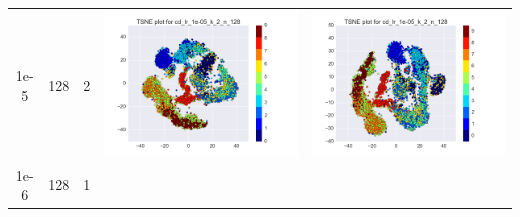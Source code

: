 \documentclass[12pt]{report}
\begin{document}
\begin{table}[H]
\begin{tabular}{ | c | c | c | c || c |}
\begin{minipage}{.3\textwidth}
    \end{minipage}
    \\ \hline
    1e-5 & 128 & 2 &
    \begin{minipage}{.3\textwidth}
      \includegraphics[scale=0.25]{cd_lr_1e-05_k_2_n_128.png}
    \end{minipage} &
    \begin{minipage}{.3\textwidth}
      \includegraphics[scale=0.25]{test_cd_lr_1e-05_k_2_n_128.png}
    \end{minipage}
    \\ \hline
    1e-6 & 128 & 1 &
    \begin{minipage}{.3\textwidth}

\end{minipage}
\end{tabular}
\end{table}
\end{document}
